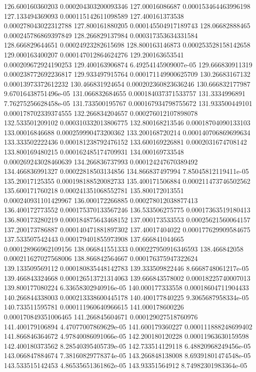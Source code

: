 {126.600160360203 0.000204303200093346
127.00016086687 0.000153464463996198
127.133494369093 0.000115142611098589
127.400161373538 0.000278043022312788
127.800161880205 0.000145504917189743
128.06682888465 0.000245786869397849
128.266829137984 0.000317353634331584
128.666829644651 0.00024923282615698
128.800163146873 0.000253528158142658
129.000163400207 0.000147012864624276
129.200163653541 0.000209672924190253
129.400163906874 6.49254145909007e-05
129.666830911319 0.000238772692236817
129.933497915764 0.000171149900625709
130.26683167132 0.00013973372612232
130.466831924654 0.000202360823636246
130.666832177987 9.67016438751496e-05
131.066832684655 0.000184037371533757
131.3334996891 7.76275256628458e-05
131.733500195767 0.000167934798755672
131.933500449101 0.000178702339374555
132.266834204657 0.000276012107898078
132.533501209102 0.000310332013806775
132.800168213546 0.00018704090133103
133.00016846688 0.000259990473200362
133.200168720214 0.000140706869699634
133.333502222436 0.000181238792476152
133.600169226881 0.0002031674708142
133.800169480215 0.000162485174709931
134.000169733548 0.000269243028460639
134.266836737993 0.000124247670389492
134.466836991327 0.00022818503134856
134.866837497994 7.85045812119411e-05
135.20017125355 0.000198188520082733
135.400171506884 0.000211473746502562
135.600171760218 0.000241351068552781
135.800172013551 0.000240931101429967
136.000172266885 0.000278012038877413
136.400172773552 0.000175370133567246
136.533506275775 0.00017363519180413
136.800173280219 0.000184875643468152
137.000173533553 0.00025621560064157
137.200173786887 0.000140471881897302
137.40017404022 0.000177629909584675
137.533507542443 0.000179401855973908
137.666841044665 0.000128966962109156
138.066841551333 0.000227950916346593
138.466842058 0.000211627027568006
138.866842564667 0.000176375947322624
139.133509569112 0.000180835448142783
139.333509822446 8.6668748061217e-05
139.466843324668 0.000126513721314063
139.666843578002 0.00018225740007013
139.800177080224 6.33658302940916e-05
140.000177333558 0.00018604711904433
140.266844338003 0.000213338600445178
140.400177840225 9.3065687958334e-05
140.733511595781 0.000111960640966615
141.000178600226 0.000170849351006465
141.266845604671 0.000129027518760976
141.400179106894 4.47077007869629e-05
141.600179360227 0.000111888248699402
141.866846364672 4.97840086091066e-05
142.200180120228 0.00011963630159598
142.400180373562 8.28540395405739e-05
142.733514129118 6.48820968249456e-05
143.066847884674 7.38160829778374e-05
143.266848138008 8.69391801474548e-05
143.533515142453 4.86535651361862e-05
143.93351564912 8.74982301983364e-05
}
